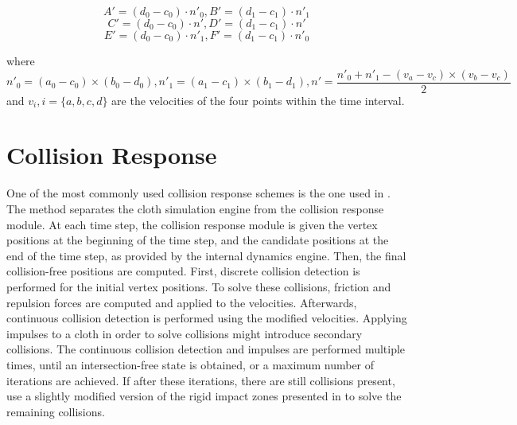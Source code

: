 \[A' = (d_{0} - c_{0}) \cdot n'_{0}, B' = (d_{1} - c_{1}) \cdot n'_{1} \]
\[C' = (d_{0} - c_{0}) \cdot n', D' = (d_{1} - c_{1}) \cdot n' \]
\[E' = (d_{0} - c_{0}) \cdot n'_{1}, F' = (d_{1} - c_{1}) \cdot n'_{0} \]

where \[n'_{0} = (a_{0} - c_{0}) \times (b_{0} - d_{0}), n'_{1} = (a_{1} - c_{1}) \times (b_{1} - d_{1}),
n' = \frac{n'_{0} + n'_{1} - (v_{a} - v_{c}) \times (v_{b} - v_{c})}{2} \] and $v_{i}, i = \{a, b, c, d\}$ are the velocities of the four points within the time interval.

\FloatBarrier
\section{Collision Response}
\label{sec:cresp}

One of the most commonly used collision response schemes is the one used in \citep{bridson02}. The method separates the cloth simulation engine from the collision response module. At each time step, the collision response module is given the vertex positions at the beginning of the time step, and the candidate positions at the end of the time step, as provided by the internal dynamics engine. Then, the final collision-free positions are computed. First, discrete collision detection is performed for the initial vertex positions. To solve these collisions, friction and repulsion forces are computed and applied to the velocities. Afterwards, continuous collision detection is performed using the modified velocities. Applying impulses to a cloth in order to solve collisions might introduce secondary collisions. The continuous collision detection and impulses are performed multiple times, until an intersection-free state is obtained, or a maximum number of iterations are achieved. If after these iterations, there are still collisions present, \citep{bridson02} use a slightly modified version of the rigid impact zones presented in \citep{provot97} to solve the remaining collisions.
